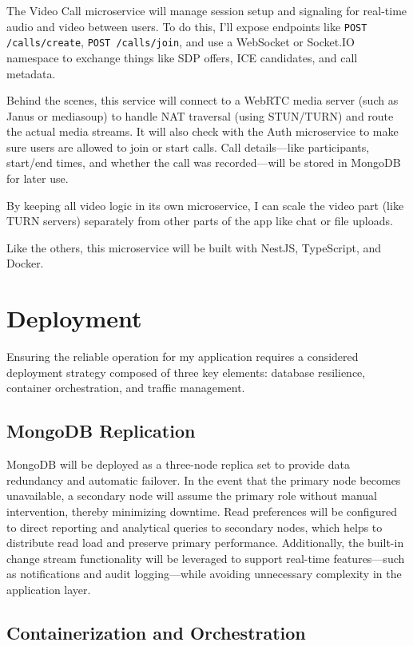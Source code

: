 The Video Call microservice will manage session setup and signaling for real-time audio and video between users. To do this, I'll expose endpoints like \texttt{POST /calls/create}, \texttt{POST /calls/join}, and use a WebSocket or Socket.IO namespace to exchange things like SDP offers, ICE candidates, and call metadata.

Behind the scenes, this service will connect to a WebRTC media server (such as Janus or mediasoup) to handle NAT traversal (using STUN/TURN) and route the actual media streams. It will also check with the Auth microservice to make sure users are allowed to join or start calls. Call details—like participants, start/end times, and whether the call was recorded—will be stored in MongoDB for later use.

By keeping all video logic in its own microservice, I can scale the video part (like TURN servers) separately from other parts of the app like chat or file uploads.

Like the others, this microservice will be built with NestJS, TypeScript, and Docker.
\section{Deployment}

Ensuring the reliable operation for my application requires a considered deployment strategy composed of three key elements: database resilience, container orchestration, and traffic management.

\subsection{MongoDB Replication}

MongoDB will be deployed as a three-node replica set to provide data redundancy and automatic failover. In the event that the primary node becomes unavailable, a secondary node will assume the primary role without manual intervention, thereby minimizing downtime. Read preferences will be configured to direct reporting and analytical queries to secondary nodes, which helps to distribute read load and preserve primary performance. Additionally, the built-in change stream functionality will be leveraged to support real-time features—such as notifications and audit logging—while avoiding unnecessary complexity in the application layer.

\subsection{Containerization and Orchestration}

